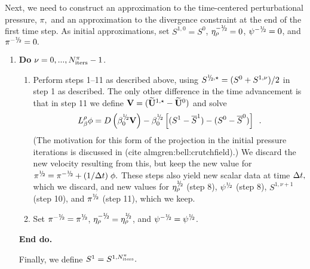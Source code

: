 Next, we need to construct an approximation to the time-centered perturbational pressure,
$\pi,$  and an approximation to the divergence constraint at the end of the
first time step.  As initial approximations, set $S^{1,0} = S^0$,
$\etarho^{-\myhalf} = 0$, $\psi^{-\myhalf} = 0$, and $\pi^{-\myhalf} = 0.$
\begin{enumerate}
  \renewcommand{\theenumi}{{\bf \alph{enumi}}}
  \renewcommand{\labelenumii}{\roman{enumii}.}
  \addtocounter{enumi}{1}
  
\item {\bf Do} {$\nu = 0,...,N_{\rm iters}^{\pi}-1$.}
  
  \begin{enumerate}
  \item Perform steps 1--11 as described above, using 
    $S^{\myhalf,\star} = (S^0 + S^{1,\nu})/2$ in step 1 as described.
    The only other difference in the time advancement is that in step 11
    we define ${\bf V} = (\widetilde{{\bf U}}^{1,\star} - \widetilde{{\bf U}}^0)$ and solve
    \begin{equation}  L_\beta^\rho \phi =
      D \left ( \beta_0^{\myhalf} {\bf V} \right) - \beta_0^{\myhalf} \left[ (S^{1}-\overline{S}^{1}) - (S^{0}-\overline{S}^{0}) \right] \enskip . 
    \end{equation}
    (The motivation for this form of the projection in the initial pressure iterations
    is discussed in (cite almgren:bell:crutchfield).)
      We discard the new velocity resulting from this, but keep the new  
      value for $\pi^{\myhalf} = \pi^{-\myhalf} + (1 / \dt) \; \phi.$  
      These steps also yield new scalar data at time $\Delta t,$ which
      we discard,  and new values for $\etarho^{\myhalf}$ (step 8), $\psi^{\myhalf}$ (step 8), 
      $S^{1,\nu+1}$ (step 10), and $\pi^{\myhalf}$ (step 11), which we keep.
    \item Set $\pi^{-\myhalf} = \pi^{\myhalf}$, $\etarho^{-\myhalf} = \etarho^{\myhalf}$,
      and $\psi^{-\myhalf} = \psi^{\myhalf}$. 
    \end{enumerate}
    
    {\bf End do.}
    
    Finally, we define $S^1 = S^{1,N_{\rm iters}^\pi}.$
    
  \end{enumerate}

